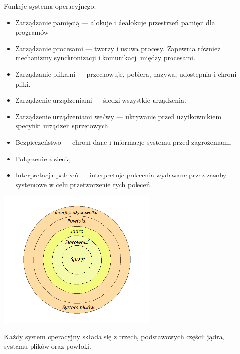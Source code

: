 \documentclass[10pt,a4paper]{report}
\begin{document}
\begin{adjustwidth}{2cm}{2cm}
\begin{minipage}{1\linewidth}
\end{minipage}
Funkcje systemu operacyjnego: \\
\begin{adjustwidth}{0.5cm}{0cm}
\begin{minipage}{1\linewidth}
\begin{itemize}
\setlength\itemsep{0.2cm}
    \item[\ding{118}]  Zarządzanie pamięcią — alokuje i dealokuje przestrzeń pamięci dla programów
    \item[\ding{118}]  Zarządzanie procesami — tworzy i usuwa procesy. Zapewnia również mechanizmy synchronizacji i komunikacji między procesami.
    \item[\ding{118}] Zarządzanie plikami — przechowuje, pobiera, nazywa, udostępnia i chroni pliki.
    \item[\ding{118}] Zarządzenie urządzeniami — śledzi wszystkie urządzenia.
    \item[\ding{118}] Zarządzenie urządzeniami we/wy — ukrywanie przed użytkownikiem specyfiki urządzeń sprzętowych.
    \item[\ding{118}] Bezpieczeństwo — chroni dane i informacje systemu przed zagrożeniami.
    \end{itemize}
    \end{minipage}
    \begin{minipage}{1\linewidth}
    \begin{itemize}
    \item[\ding{118}] Połączenie z siecią. 
    \item[\ding{118}] Interpretacja poleceń — interpretuje polecenia wydawane przez zasoby systemowe w celu przetworzenie tych poleceń.
\end{itemize}
\end{minipage}
\end{adjustwidth}
 \begin{minipage}{\linewidth}
\begin{center}
  \includegraphics[width=300px]{img/system}
\end{center}
\end{minipage}
\begin{minipage}{1\linewidth}
\vspace{0.3cm}
Każdy system operacyjny składa się z trzech, podstawowych części: jądra, systemu plików oraz powłoki.
\end{minipage}

\end{adjustwidth}
\end{document}
